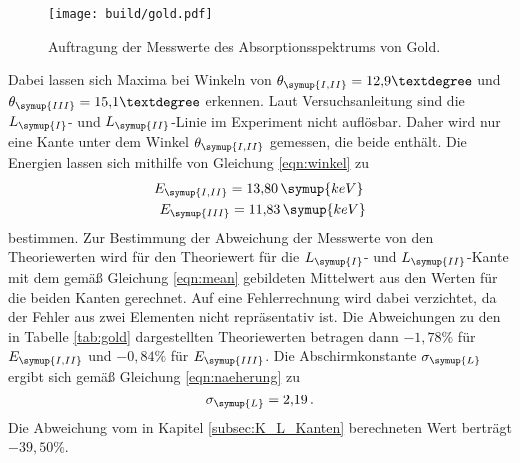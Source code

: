 \begin{figure}
  \centering
  \texttt{[image: build/gold.pdf]}
  \caption{Auftragung der Messwerte des Absorptionsspektrums von Gold.}
  \label{fig:gold}
\end{figure}

Dabei lassen sich Maxima bei Winkeln von $\theta_{\symup{I,II}}=12{,}9°$ und
$\theta_{\symup{III}}=15{,}1°$ erkennen. Laut Versuchsanleitung \cite{Versuchsanleitung}
sind die $L_{\symup{I}}$- und $L_{\symup{II}}$-Linie im Experiment nicht auflösbar.
Daher wird nur eine Kante unter dem Winkel $\theta_{\symup{I,II}}$ gemessen, die
beide enthält. Die Energien lassen sich mithilfe von Gleichung \eqref{eqn:winkel}
zu
\begin{align*}
  E_{\symup{I,II}}=13{,}80\,\symup{keV} \, \\
  E_{\symup{III}}=11{,}83\,\symup{keV}
\end{align*}
bestimmen.
Zur Bestimmung der Abweichung der Messwerte von den Theoriewerten wird für den
Theoriewert für die $L_{\symup{I}}$- und $L_{\symup{II}}$-Kante mit
dem gemäß Gleichung \eqref{eqn:mean} gebildeten Mittelwert aus den Werten für
die beiden Kanten gerechnet. Auf eine Fehlerrechnung wird dabei verzichtet, da
der Fehler aus zwei Elementen nicht repräsentativ ist.
Die Abweichungen zu den in Tabelle \ref{tab:gold} dargestellten Theoriewerten
betragen dann $-1{,}78\%$ für $E_{\symup{I,II}}$ und $-0{,}84\%$ für $E_{\symup{III}}$.
Die Abschirmkonstante $\sigma_{\symup{L}}$ ergibt sich gemäß Gleichung
\eqref{eqn:naeherung} zu
\begin{equation*}
  \sigma_{\symup{L}}=2{,}19 \,.
\end{equation*}
Die Abweichung vom in Kapitel \ref{subsec:K_L_Kanten} berechneten Wert berträgt
$-39{,}50\%$.
